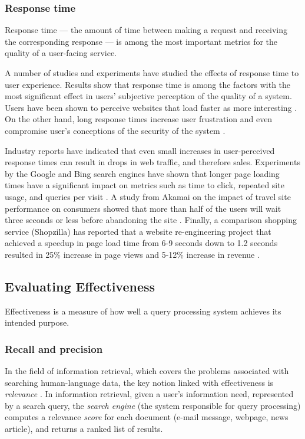 \subsubsection{Response time}
Response time --- the amount of time between making a request and receiving the corresponding response ---
is among the most important metrics for the quality of a user-facing service.

A number of studies and experiments have studied the effects of response time to user experience.
Results show that response time is among the factors with the most significant effect in users' subjective perception
of the quality of a system.
Users have been shown to perceive websites that load faster as more interesting \cite{ramsay/retrievaltimesinvestigation}.
On the other hand, long response times increase user frustration \cite{ceaparu:userfrustration} and even compromise
user's conceptions of the security of the system \cite{bouch:qualityeyebeholder}.

Industry reports have indicated that even small increases in user-perceived response times can result in drops in web
traffic, and therefore sales.
Experiments by the Google and Bing search engines have shown that longer page loading times have a significant impact on
metrics such as time to click, repeated site usage, and queries per visit \cite{schurman:rerformanceuserimpact}.
A study from Akamai on the impact of travel site performance on consumers showed that more than half of the users will
wait three seconds or less before abandoning the site \cite{akamai:travelsiteperformance}.
Finally, a comparison shopping service (Shopzilla) has reported that a website re-engineering project that achieved a
speedup in page load time from 6-9 seconds down to 1.2 seconds resulted in 25\% increase in page views and 5-12\%
increase in revenue \cite{dixon:shopzillasiteredo}.

\subsection{Evaluating Effectiveness}

Effectiveness is a measure of how well a query processing system achieves its intended purpose.

\subsubsection{Recall and precision}

In the field of information retrieval, which covers the problems associated with searching human-language data,
the key notion linked with effectiveness is \textit{relevance} \cite{buttcher:informationretrieval}.
In information retrieval, given a user's information need, represented by a search query, the \textit{search engine}
(the system responsible for query processing) computes a relevance \textit{score} for each document (e-mail message,
webpage, news article), and returns a ranked list of results.

